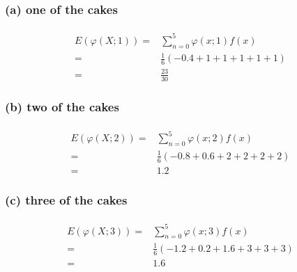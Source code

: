 \documentclass{article}
\begin{document}
            \subsubsection*{(a) one of the cakes}
                \paragraph{
                    \begin{equation*}
                        \begin{split}
                            E(\varphi(X;1))=&\sum _{n=0} ^5 \varphi(x;1)f(x)\\
                                        =&\frac{1}{6}(-0.4+1+1+1+1+1)\\
                                        =&\frac{23}{30}
                        \end{split}
                    \end{equation*}
                }
            \subsubsection*{ (b) two of the cakes}
            \paragraph{
                \begin{equation*}
                    \begin{split}
                        E(\varphi(X;2))=&\sum _{n=0} ^5 \varphi(x;2)f(x)\\
                                    =&\frac{1}{6}(-0.8+0.6+2+2+2+2)\\
                                    =&1.2
                    \end{split}
                \end{equation*}
            }
            \subsubsection*{  (c) three of the cakes}
            \paragraph{
                \begin{equation*}
                    \begin{split}
                        E(\varphi(X;3))=&\sum _{n=0} ^5 \varphi(x;3)f(x)\\
                                    =&\frac{1}{6}(-1.2+0.2+1.6+3+3+3)\\
                                    =&1.6
                    \end{split}
                \end{equation*}
            }
\end{document}
